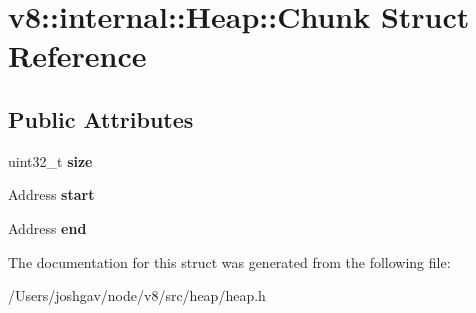 \hypertarget{structv8_1_1internal_1_1_heap_1_1_chunk}{}\section{v8\+:\+:internal\+:\+:Heap\+:\+:Chunk Struct Reference}
\label{structv8_1_1internal_1_1_heap_1_1_chunk}
\subsection*{Public Attributes}
\begin{DoxyCompactItemize}
\item 
uint32\+\_\+t {\bfseries size}\hypertarget{structv8_1_1internal_1_1_heap_1_1_chunk_ae3e180f5b7266142631483907c1aae8d}{}\label{structv8_1_1internal_1_1_heap_1_1_chunk_ae3e180f5b7266142631483907c1aae8d}

\item 
Address {\bfseries start}\hypertarget{structv8_1_1internal_1_1_heap_1_1_chunk_a8c8281ad02fc580310c92ac8c5aa786f}{}\label{structv8_1_1internal_1_1_heap_1_1_chunk_a8c8281ad02fc580310c92ac8c5aa786f}

\item 
Address {\bfseries end}\hypertarget{structv8_1_1internal_1_1_heap_1_1_chunk_a633e27a9bcce2e21a25585ef0f9120f1}{}\label{structv8_1_1internal_1_1_heap_1_1_chunk_a633e27a9bcce2e21a25585ef0f9120f1}

\end{DoxyCompactItemize}


The documentation for this struct was generated from the following file\+:\begin{DoxyCompactItemize}
\item 
/\+Users/joshgav/node/v8/src/heap/heap.\+h\end{DoxyCompactItemize}
